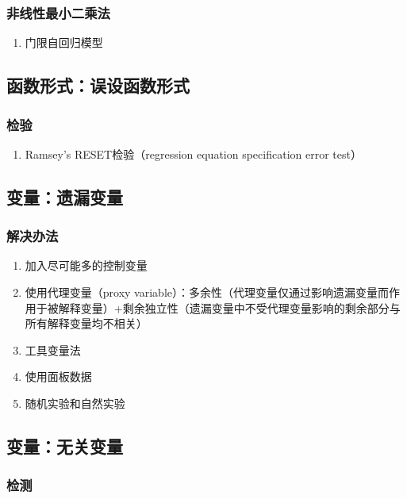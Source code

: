 \documentclass[12pt]{book}
\begin{document}
\subsubsection{非线性最小二乘法}


\begin{enumerate}[1.]
    \item 门限自回归模型
\end{enumerate}


\subsection{函数形式：误设函数形式}

\subsubsection{检验}

\begin{enumerate}[1.]
    \item Ramsey's RESET检验（regression equation specification error test）
\end{enumerate}

\subsection{变量：遗漏变量}

\subsubsection{解决办法}

\begin{enumerate}[1.]
    \item 加入尽可能多的控制变量  
    \item 使用代理变量（proxy variable）：多余性（代理变量仅通过影响遗漏变量而作用于被解释变量）+剩余独立性（遗漏变量中不受代理变量影响的剩余部分与所有解释变量均不相关）  
    \item 工具变量法  
    \item 使用面板数据  
    \item 随机实验和自然实验 
\end{enumerate}


\subsection{变量：无关变量}



\subsubsection{检测}
\end{document}
